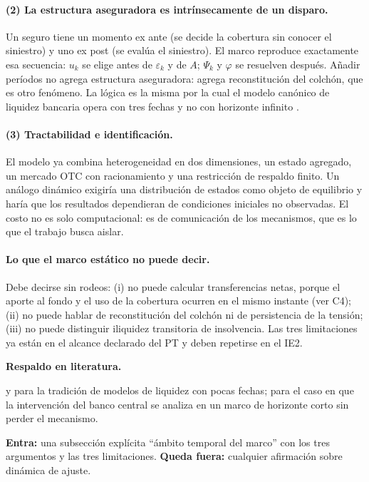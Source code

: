 \documentclass[11pt]{article}
\newcommand{\lit}{\par\noindent\textbf{Respaldo en literatura.}\par}
\theoremstyle{definition}
\begin{document}
\paragraph{(2) La estructura aseguradora es intr\'insecamente de un disparo.} Un
seguro tiene un momento ex ante (se decide la cobertura sin conocer el
siniestro) y uno ex post (se eval\'ua el siniestro). El marco reproduce
exactamente esa secuencia: $u_k$ se elige antes de $\varepsilon_k$ y de $A$;
$\Psi_k$ y $\varphi$ se resuelven despu\'es. A\~nadir per\'iodos no agrega
estructura aseguradora: agrega reconstituci\'on del colch\'on, que es otro
fen\'omeno. La l\'ogica es la misma por la cual el modelo can\'onico de liquidez
bancaria opera con tres fechas y no con horizonte infinito
\citep{diamonddybvig1983,holmstromtirole1998}.

\paragraph{(3) Tractabilidad e identificaci\'on.} El modelo ya combina
heterogeneidad en dos dimensiones, un estado agregado, un mercado OTC con
racionamiento y una restricci\'on de respaldo finito. Un an\'alogo din\'amico
exigir\'ia una distribuci\'on de estados como objeto de equilibrio y har\'ia que
los resultados dependieran de condiciones iniciales no observadas. El costo no
es solo computacional: es de comunicaci\'on de los mecanismos, que es lo que el
trabajo busca aislar.

\paragraph{Lo que el marco est\'atico no puede decir.} Debe decirse sin rodeos:
(i) no puede calcular transferencias netas, porque el aporte al fondo y el uso
de la cobertura ocurren en el mismo instante (ver C4); (ii) no puede hablar de
reconstituci\'on del colch\'on ni de persistencia de la tensi\'on; (iii) no puede
distinguir iliquidez transitoria de insolvencia. Las tres limitaciones ya est\'an
en el alcance declarado del PT y deben repetirse en el IE2.

\lit
\citet{diamonddybvig1983} y \citet{holmstromtirole1998} para la tradici\'on de
modelos de liquidez con pocas fechas;
\citet{allencarlettigale2009} para el caso en que la intervenci\'on del banco
central se analiza en un marco de horizonte corto sin perder el mecanismo.

\begin{ie2}
\textbf{Entra:} una subsecci\'on expl\'icita ``\'ambito temporal del marco'' con los
tres argumentos y las tres limitaciones.
\textbf{Queda fuera:} cualquier afirmaci\'on sobre din\'amica de ajuste.
\end{ie2}
\end{document}
